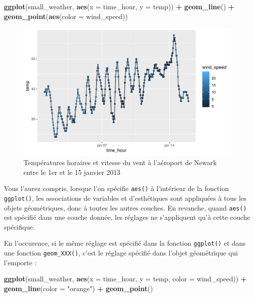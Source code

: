 \documentclass[a4paperpaper,]{article}
\newenvironment{Shaded}{\begin{snugshade}}{\end{snugshade}}
\newcommand{\KeywordTok}[1]{\textcolor[rgb]{0.13,0.29,0.53}{\textbf{#1}}}
\newcommand{\DataTypeTok}[1]{\textcolor[rgb]{0.13,0.29,0.53}{#1}}
\newcommand{\StringTok}[1]{\textcolor[rgb]{0.31,0.60,0.02}{#1}}
\newcommand{\OperatorTok}[1]{\textcolor[rgb]{0.81,0.36,0.00}{\textbf{#1}}}
\newcommand{\NormalTok}[1]{#1}
\theoremstyle{definition}
\theoremstyle{definition}
\theoremstyle{definition}
\theoremstyle{remark}
\begin{document}
\begin{Shaded}
\begin{Highlighting}[]
\KeywordTok{ggplot}\NormalTok{(small_weather, }\KeywordTok{aes}\NormalTok{(}\DataTypeTok{x =}\NormalTok{ time_hour, }\DataTypeTok{y =}\NormalTok{ temp)) }\OperatorTok{+}
\StringTok{  }\KeywordTok{geom_line}\NormalTok{() }\OperatorTok{+}
\StringTok{  }\KeywordTok{geom_point}\NormalTok{(}\KeywordTok{aes}\NormalTok{(}\DataTypeTok{color =}\NormalTok{ wind_speed))}
\end{Highlighting}
\end{Shaded}

\begin{figure}[htpb]

{\centering \includegraphics[width=0.9\linewidth]{figure/wind3-1} 

}

\caption{Températures horaires et vitesse du vent à l'aéroport de Newark entre le 1er et le 15 janvier 2013}\label{fig:wind3}
\end{figure}

Vous l'aurez compris, lorsque l'on spécifie \texttt{aes()} à l'intérieur
de la fonction \texttt{ggplot()}, les associations de variables et
d'esthétiques sont appliquées à tous les objets géométriques, donc à
toutes les autres couches. En revanche, quand \texttt{aes()} est
spécifié dans une couche donnée, les réglages ne s'appliquent qu'à cette
couche spécifique.

En l'occurence, si le même réglage est spécifié dans la fonction
\texttt{ggplot()} et dans une fonction \texttt{geom\_XXX()}, c'est le
réglage spécifié dans l'objet géométrique qui l'emporte :

\begin{Shaded}
\begin{Highlighting}[]
\KeywordTok{ggplot}\NormalTok{(small_weather, }\KeywordTok{aes}\NormalTok{(}\DataTypeTok{x =}\NormalTok{ time_hour, }\DataTypeTok{y =}\NormalTok{ temp, }\DataTypeTok{color =}\NormalTok{ wind_speed)) }\OperatorTok{+}
\StringTok{  }\KeywordTok{geom_line}\NormalTok{(}\DataTypeTok{color =} \StringTok{"orange"}\NormalTok{) }\OperatorTok{+}
\StringTok{  }\KeywordTok{geom_point}\NormalTok{()}
\end{Highlighting}
\end{Shaded}
\end{document}
